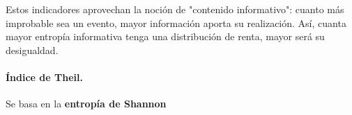 


Estos indicadores aprovechan la noci\'on de "contenido informativo": cuanto m\'as improbable sea un evento, mayor informaci\'on aporta su realizaci\'on. As\'i, cuanta mayor entrop\'ia informativa tenga una distribuci\'on de renta, mayor ser\'a su desigualdad.

\paragraph{\'Indice de Theil.}

Se basa en la \textbf{entrop\'ia de Shannon}








